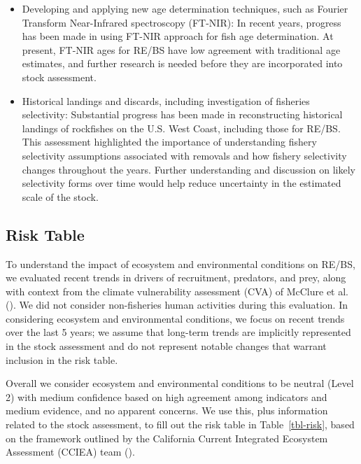\documentclass[
]{scrartcl}
\begin{document}
\begin{itemize}
  may improve our understanding of RE/BS natural mortality.
\item
  Developing and applying new age determination techniques, such as
  Fourier Transform Near-Infrared spectroscopy (FT-NIR): In recent
  years, progress has been made in using FT-NIR approach for fish age
  determination. At present, FT-NIR ages for RE/BS have low agreement
  with traditional age estimates, and further research is needed before
  they are incorporated into stock assessment.
\item
  Historical landings and discards, including investigation of fisheries
  selectivity: Substantial progress has been made in reconstructing
  historical landings of rockfishes on the U.S. West Coast, including
  those for RE/BS. This assessment highlighted the importance of
  understanding fishery selectivity assumptions associated with removals
  and how fishery selectivity changes throughout the years. Further
  understanding and discussion on likely selectivity forms over time
  would help reduce uncertainty in the estimated scale of the stock.
\end{itemize}

\newpage

\subsection*{Risk Table}\label{risk-table}

To understand the impact of ecosystem and environmental conditions on
RE/BS, we evaluated recent trends in drivers of recruitment, predators,
and prey, along with context from the climate vulnerability assessment
(CVA) of McClure et al. (). We did not
consider non-fisheries human activities during this evaluation. In
considering ecosystem and environmental conditions, we focus on recent
trends over the last 5 years; we assume that long-term trends are
implicitly represented in the stock assessment and do not represent
notable changes that warrant inclusion in the risk table.

Overall we consider ecosystem and environmental conditions to be neutral
(Level 2) with medium confidence based on high agreement among
indicators and medium evidence, and no apparent concerns. We use this,
plus information related to the stock assessment, to fill out the risk
table in Table~\ref{tbl-risk}, based on the framework outlined by the
California Current Integrated Ecosystem Assessment (CCIEA) team
().
\end{document}
